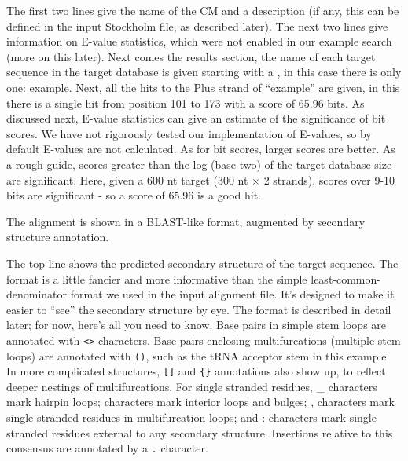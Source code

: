 The first two lines give the name of the CM and a description (if any,
this can be defined in the input Stockholm file, as described later).
The next two lines give information on E-value statistics, which were
not enabled in our example search (more on this later).  Next comes
the results section, the name of each target sequence in the target
database is given starting with a \>, in this case there is only one:
example. Next, all the hits to the Plus strand of ``example'' are
given, in this there is a single hit from position 101 to 173 with a
score of 65.96 bits. As discussed next, E-value statistics can give an
estimate of the significance of bit scores. We have not rigorously
tested our implementation of E-values, so by default E-values are not
calculated. As for bit scores, larger scores are better. As a rough
guide, scores greater than the log (base two) of the target database
size are significant.  Here, given a 600 nt target (300 nt $\times$ 2
strands), scores over 9-10 bits are significant - so a score of 65.96
is a good hit.


The alignment is shown in a BLAST-like format, augmented by secondary
structure annotation. 

The top line shows the predicted secondary structure of the target
sequence. The format is a little fancier and more informative than the
simple least-common-denominator format we used in the input alignment
file. It's designed to make it easier to ``see'' the secondary
structure by eye. The format is described in detail later; for now,
here's all you need to know. Base pairs in simple stem loops are
annotated with \verb+<>+ characters. Base pairs enclosing
multifurcations (multiple stem loops) are annotated with \verb+()+,
such as the tRNA acceptor stem in this example. In more complicated
structures, \verb+[]+ and \verb+{}+ annotations also show up, to
reflect deeper nestings of multifurcations. For single stranded
residues, \_ characters mark hairpin loops; \- characters mark
interior loops and bulges; , characters mark single-stranded residues
in multifurcation loops; and : characters mark single stranded
residues external to any secondary structure. Insertions relative to
this consensus are annotated by a \verb+.+ character.

